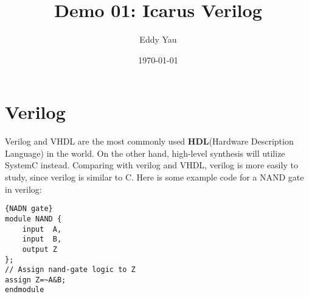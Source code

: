 \documentclass[12pt,a4paper]{article}
\title{Demo 01: Icarus Verilog\vspace{-1ex}}
\author{Eddy Yau\vspace{-2ex}}
\date{\today}
\begin{document}
\maketitle
\section*{Verilog}
Verilog and VHDL are the most commonly used \textbf{HDL}(Hardware Description Language) in the world. 
On the other hand, high-level synthesis will utilize SystemC instead. 
Comparing with verilog and VHDL, verilog is more easily to study, since verilog is similar to C.
\newline
Here is some example code for a NAND gate in verilog:

\lstset{tabsize=2,breaklines=true,numbers=left,basicstyle=footnotesize,xleftmargin=30pt}

\begin{lstlisting}[style={verilog-style},frame=single]{NADN gate}
module NAND {
	input  A,
	input  B,
	output Z
};
// Assign nand-gate logic to Z
assign Z=~A&B;
endmodule
\end{lstlisting}
\end{document}
